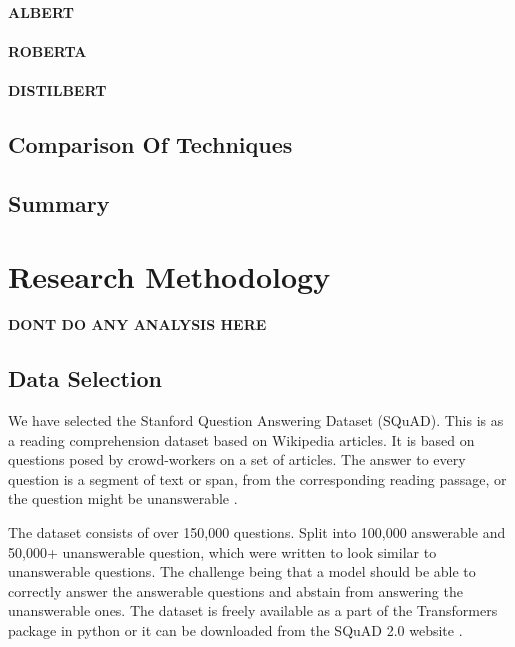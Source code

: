 \documentclass[12pt]{report}
\begin{document}
	       \subsubsection{ALBERT}\label{2322}
	       \cite{albert}

	       \subsubsection{ROBERTA}\label{2323}
	       \cite{roberta}

	       \subsubsection{DISTILBERT}\label{2324}
	       \cite{distil}
        \section{Comparison Of Techniques}\label{24}
        \section{Summary}\label{25}
        \citep{RAM}

    \chapter{\centering Research Methodology}\label{c3}
    \textbf{DONT DO ANY ANALYSIS HERE}
    \section{Data Selection}\label{c31}
    	We have selected the Stanford Question Answering Dataset (SQuAD). This is as a reading comprehension dataset based on Wikipedia articles. It is based on questions posed by crowd-workers on a set of articles. The answer to every question is a segment of text or span, from the corresponding reading passage, or the question might be unanswerable \citep{dataset}.

    The dataset consists of over 150,000 questions. Split into 100,000 answerable and 50,000+ unanswerable question, which were written to look similar to unanswerable questions. The challenge being that a model should be able to correctly answer the answerable questions and abstain from answering the unanswerable ones.
    The dataset is freely available as a part of the Transformers package in python or it can be downloaded from the SQuAD 2.0 website \citep{squad}.
\end{document}
